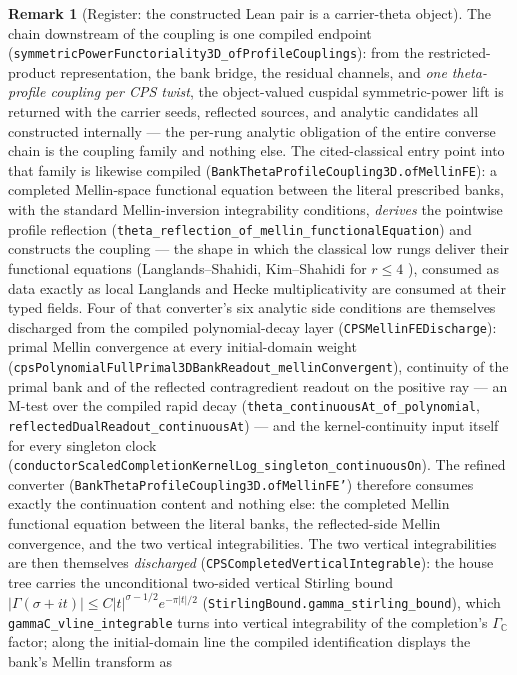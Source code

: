 \documentclass[11pt]{article}
\theoremstyle{definition}
\newtheorem{remark}[theorem]{Remark}
\begin{document}
\begin{remark}[Register: the constructed Lean pair is a carrier-theta object]
The chain downstream of the coupling is one compiled endpoint
(\texttt{symmetricPowerFunctoriality3D\_ofProfileCouplings}): from the restricted-product
representation, the bank bridge, the residual channels, and \emph{one theta-profile coupling per
CPS twist}, the object-valued cuspidal symmetric-power lift is returned with the carrier seeds,
reflected sources, and analytic candidates all constructed internally --- the per-rung analytic
obligation of the entire converse chain is the coupling family and nothing else.  The
cited-classical entry point into that family is likewise compiled
(\texttt{BankThetaProfileCoupling3D.ofMellinFE}): a completed Mellin-space functional equation
between the literal prescribed banks, with the standard Mellin-inversion integrability
conditions, \emph{derives} the pointwise profile reflection
(\texttt{theta\_reflection\_of\_mellin\_functionalEquation}) and constructs the coupling ---
the shape in which the classical low rungs deliver their functional equations
(Langlands--Shahidi, Kim--Shahidi for $r\le4$ \cite{Shahidi,KimShahidi}), consumed as data
exactly as local Langlands and Hecke multiplicativity are consumed at their typed fields.
Four of that converter's six analytic side conditions are themselves discharged from the
compiled polynomial-decay layer (\texttt{CPSMellinFEDischarge}): primal Mellin convergence at
every initial-domain weight
(\texttt{cpsPolynomialFullPrimal3DBankReadout\_mellinConvergent}), continuity of the primal bank
and of the reflected contragredient readout on the positive ray --- an M-test over the compiled
rapid decay (\texttt{theta\_continuousAt\_of\_polynomial},
\texttt{reflectedDualReadout\_continuousAt}) --- and the kernel-continuity input itself for
every singleton clock (\texttt{conductorScaledCompletionKernelLog\_singleton\_continuousOn}).
The refined converter (\texttt{BankThetaProfileCoupling3D.ofMellinFE'}) therefore consumes
exactly the continuation content and nothing else: the completed Mellin functional equation
between the literal banks, the reflected-side Mellin convergence, and the two vertical
integrabilities.  The two vertical integrabilities are then themselves \emph{discharged}
(\texttt{CPSCompletedVerticalIntegrable}): the house tree carries the unconditional two-sided
vertical Stirling bound $|\Gamma(\sigma+it)|\le C|t|^{\sigma-1/2}e^{-\pi|t|/2}$
(\texttt{StirlingBound.gamma\_stirling\_bound}), which \texttt{gammaC\_vline\_integrable} turns
into vertical integrability of the completion's $\Gamma_{\mathbb C}$ factor; along the
initial-domain line the compiled identification displays the bank's Mellin transform as

\end{remark}
\end{document}
